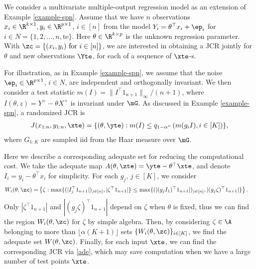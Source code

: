 \documentclass[english]{article}
\begin{document}
\begin{example}%
\label{example:adequate-set-spn}
    We consider a multivariate multiple-output regression model as an extension of Example \ref{example-spn}. Assume that we have $n$  observations $x_i \in \R^{k \times 1}, y_i \in \R^{p \times 1}$, $i\in [n]$ from the model $Y_i = \theta^\top x_i + \ep_i$ for 
    $i \in N =\{1,2,\ldots,n,\mathrm{te}\}$. 
    Here $\theta \in \R^{k \times p}$ is the unknown regression parameter.
    With $\zc = \{(x_i,y_i) \textnormal{ for } i\in [n]\}$, we are interested in obtaining a JCR jointly for $\theta$ and new observations $\Yte$, for each of a sequence of $\xte$-s. 
    
For illustration, as in Example \ref{example-spn}, we assume that 
the noise $\ep_i \in \R^{p \times 1}$, $i \in N$,
are independent 
and orthogonally invariant.
We then consider a test statistic $m(I) = \| I^\top 1_{n+1}\|_\infty/(n+1)$, where $I(\theta,z) = Y^+ - \theta X^+$ is invariant under $\mG$. 
As discussed in Example \ref{example-spn}, a randomized JCR is
       \begin{align*}
        J(x_{1:n},y_{1:n},\xte) = \{(\theta,\yte): m(I) \leq q_{1-\alpha''}\left(m(g_iI), i\in[K] \right)  \},
    \end{align*}
    where $G_{1:K}$ are sampled iid from the Haar measure over $\mG$.
    
    Here we describe a corresponding adequate set for reducing the computational cost. We take the adequate map $A(\theta,\zte) = \yte - \theta^\top \xte$, and denote $I_i = y_i - \theta^\top x_i$ for simplicity. For each $g_j$, $j\in[K]$, we consider
    \begin{align*}
    W_i(\theta,\zc) = 
        &\left\{\zeta: \max\{(|I_j^\top 1_{n+1}|)_{j\in[n]},|\zeta^\top 1_{n+1}|\}    \leq
        \max\{(|(g_jI_1)^\top1_{n+1}|)_{j\in[n]},| (g_j\zeta)^\top1_{n+1}|\} \right\}.
    \end{align*}
    Only $|\zeta^\top 1_{n+1}|$ and $|(g_j\zeta)^\top 1_{n+1}|$ depend on $\zeta$ when $\theta$ is fixed, thus we can find the region $W_i(\theta,\zc)$ for $\zeta$ by simple algebra. Then, by considering $\zeta\in \A$ belonging to more than $\lfloor \alpha (K+1) \rfloor$ sets $\{W_i(\theta,\zc)\}_{i \in [K]}$, we find the adequate set $W(\theta,\zc)$.
    Finally, for each input $\xte$, we can find the corresponding JCR via \eqref{ade},
    which may save computation
    when we have a large number of test points $\xte$.
    
\end{example}
\end{document}
